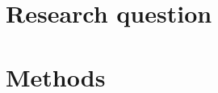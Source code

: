 \documentclass[11pt]{article}
\begin{document}

\section{Research question}
%
%
%
%
%
%





\section{Methods}
\label{methods}
\end{document}
